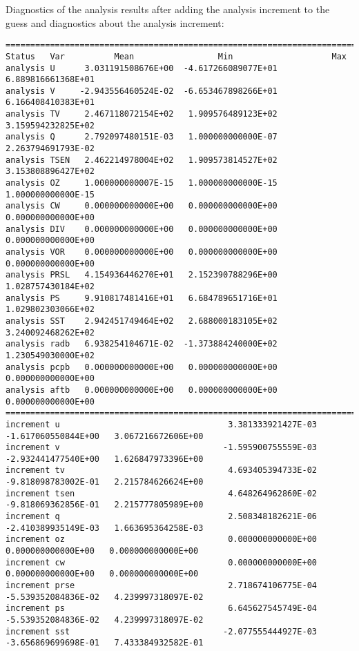 Diagnostics of the analysis results after adding the analysis increment to the guess and diagnostics about the analysis increment: 
\begin{scriptsize}
\begin{verbatim}
================================================================================
Status   Var          Mean                 Min                    Max
analysis U      3.031191508676E+00  -4.617266089077E+01   6.889816661368E+01
analysis V     -2.943556460524E-02  -6.653467898266E+01   6.166408410383E+01
analysis TV     2.467118072154E+02   1.909576489123E+02   3.159594232825E+02
analysis Q      2.792097480151E-03   1.000000000000E-07   2.263794691793E-02
analysis TSEN   2.462214978004E+02   1.909573814527E+02   3.153808896427E+02
analysis OZ     1.000000000007E-15   1.000000000000E-15   1.000000000000E-15
analysis CW     0.000000000000E+00   0.000000000000E+00   0.000000000000E+00
analysis DIV    0.000000000000E+00   0.000000000000E+00   0.000000000000E+00
analysis VOR    0.000000000000E+00   0.000000000000E+00   0.000000000000E+00
analysis PRSL   4.154936446270E+01   2.152390788296E+00   1.028757430184E+02
analysis PS     9.910817481416E+01   6.684789651716E+01   1.029802303066E+02
analysis SST    2.942451749464E+02   2.688000183105E+02   3.240092468262E+02
analysis radb   6.938254104671E-02  -1.373884240000E+02   1.230549030000E+02
analysis pcpb   0.000000000000E+00   0.000000000000E+00   0.000000000000E+00
analysis aftb   0.000000000000E+00   0.000000000000E+00   0.000000000000E+00
================================================================================
increment u                                  3.381333921427E-03  -1.617060550844E+00   3.067216672606E+00
increment v                                 -1.595900755559E-03  -2.932441477540E+00   1.626847973396E+00
increment tv                                 4.693405394733E-02  -9.818098783002E-01   2.215784626624E+00
increment tsen                               4.648264962860E-02  -9.818069362856E-01   2.215777805989E+00
increment q                                  2.508348182621E-06  -2.410389935149E-03   1.663695364258E-03
increment oz                                 0.000000000000E+00   0.000000000000E+00   0.000000000000E+00
increment cw                                 0.000000000000E+00   0.000000000000E+00   0.000000000000E+00
increment prse                               2.718674106775E-04  -5.539352084836E-02   4.239997318097E-02
increment ps                                 6.645627545749E-04  -5.539352084836E-02   4.239997318097E-02
increment sst                               -2.077555444927E-03  -3.656869699698E-01   7.433384932582E-01 
\end{verbatim}
\end{scriptsize}

